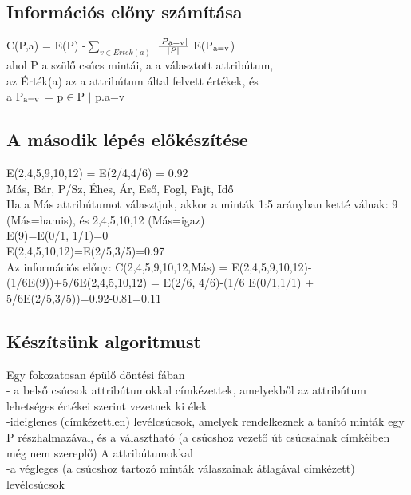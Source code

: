 \documentclass{article}
\begin{document}
	 \subsection{Információs előny számítása}
	 C(P,a) = E(P) -$\sum_{v\in Ertek(a)}^{}$ $\frac{|P\textsubscript{a=v}|}{|P|}$ E(P$\textsubscript{a=v}$)\\
	 ahol P a szülő csúcs mintái, a a választott attribútum,\\
	 az Érték(a) az a attribútum által felvett értékek, és \\
	 a P$\textsubscript{a=v}$ = {p$\in$P $|$ p.a=v}
	 	
	 \subsection{A második lépés előkészítése}
	 E({2,4,5,9,10,12}) = E(2/4,4/6) = 0.92\\
	 Más, Bár, P/Sz, Éhes, Ár, Eső, Fogl, Fajt, Idő\\
	 Ha a Más attribútumot választjuk, akkor a minták 1:5 arányban ketté válnak: {9} (Más=hamis), és {2,4,5,10,12} (Más=igaz)\\
	 E({9})=E(0/1, 1/1)=0\\
	 E({2,4,5,10,12})=E(2/5,3/5)=0.97\\
	 Az információs előny: C({2,4,5,9,10,12},Más) = E({2,4,5,9,10,12})-(1/6E({9}))+5/6E({2,4,5,10,12}) = E(2/6, 4/6)-(1/6 E(0/1,1/1) + 5/6E(2/5,3/5))=0.92-0.81=0.11
	 
	 \newpage
	 \subsection{Készítsünk algoritmust}
	 Egy fokozatosan épülő döntési fában\\
	 - a belső csúcsok attribútumokkal címkézettek, amelyekből az attribútum lehetséges értékei szerint vezetnek ki élek\\
	 -ideiglenes (címkézettlen) levélcsúcsok, amelyek rendelkeznek a tanító minták egy P részhalmazával, és a választható (a csúcshoz vezető út csúcsainak címkéiben még nem szereplő) A attribútumokkal\\
	 -a végleges (a csúcshoz tartozó minták válaszainak átlagával címkézett) levélcsúcsok
	 
\end{document}
